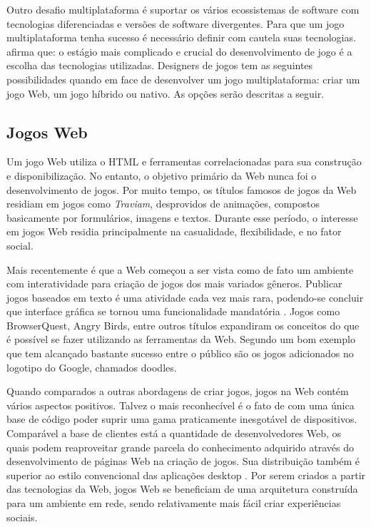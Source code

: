 Outro desafio multiplataforma é suportar os vários ecossistemas
de software com tecnologias diferenciadas e versões de
software divergentes. Para que um jogo multiplataforma tenha
sucesso é necessário definir com cautela suas tecnologias.
\citet{html5mostwanted} afirma que: o estágio mais complicado e crucial
do desenvolvimento de jogo é a escolha das tecnologias utilizadas.
Designers de jogos tem as seguintes possibilidades quando em face
de desenvolver um jogo multiplataforma: criar um jogo Web, um jogo
híbrido ou nativo. As opções serão descritas a seguir.

\subsection{Jogos Web}

Um jogo Web utiliza o HTML e ferramentas correlacionadas
para sua construção e disponibilização. No entanto, o objetivo
primário da Web nunca foi o desenvolvimento de jogos. Por muito
tempo, os títulos famosos de jogos da Web residiam em jogos como
\textit{Traviam}, desprovidos de animações, compostos basicamente por
formulários, imagens e textos. Durante esse período, o interesse em
jogos Web residia principalmente na casualidade, flexibilidade, e no
fator social.

Mais recentemente é que a Web começou a ser vista como de fato um
ambiente com interatividade para criação de jogos dos mais variados
gêneros. Publicar jogos baseados em texto é uma atividade cada vez
mais rara, podendo-se concluir que interface gráfica se tornou uma
funcionalidade mandatória \autocite{browserGamesTechnologyAndFuture}.
Jogos como BrowserQuest, Angry Birds, entre outros títulos expandiram
os conceitos do que é possível se fazer utilizando as ferramentas
da Web. Segundo \citet[p. 28]{gwt} um bom exemplo que tem alcançado
bastante sucesso entre o público são os jogos adicionados no logotipo
do Google, chamados doodles.

Quando comparados a outras abordagens de criar jogos, jogos na Web
contém vários aspectos positivos. Talvez o mais reconhecível
é o fato de com uma única base de código poder suprir uma gama
praticamente inesgotável de dispositivos. Comparável a base de
clientes está a quantidade de desenvolvedores Web, os quais podem
reaproveitar grande parcela do conhecimento adquirido através
do desenvolvimento de páginas Web na criação de jogos. Sua
distribuição também é superior ao estilo convencional das
aplicações desktop \autocite{browserGamesTechnologyAndFuture}. Por
serem criados a partir das tecnologias da Web, jogos Web se beneficiam
de uma arquitetura construída para um ambiente em rede, sendo
relativamente mais fácil criar experiências sociais.

